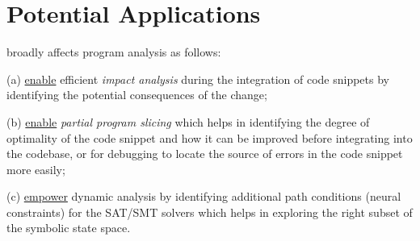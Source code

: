 \section{Potential Applications}
\tool broadly affects program analysis as follows:

(a) \underline{enable} efficient \textit{impact analysis} during the integration of code snippets by identifying the potential consequences of the change;

(b) \underline{enable} \textit{partial program slicing} which helps in identifying the degree of optimality of the code snippet and how it can be improved before integrating into the codebase, or for debugging to locate the source of errors in the code snippet more easily;

(c) \underline{empower} dynamic analysis by identifying additional path conditions (neural constraints) for the SAT/SMT solvers which helps in exploring the right subset of the symbolic state space. 
